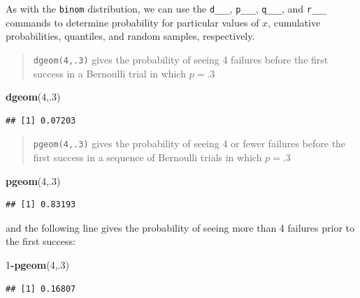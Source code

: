 \documentclass[
]{book}
\newenvironment{Shaded}{\begin{snugshade}}{\end{snugshade}}
\newcommand{\DecValTok}[1]{\textcolor[rgb]{0.00,0.00,0.81}{#1}}
\newcommand{\FunctionTok}[1]{\textcolor[rgb]{0.13,0.29,0.53}{\textbf{#1}}}
\newcommand{\NormalTok}[1]{#1}
\newcommand{\SpecialCharTok}[1]{\textcolor[rgb]{0.81,0.36,0.00}{\textbf{#1}}}
\theoremstyle{definition}
\theoremstyle{definition}
\theoremstyle{definition}
\theoremstyle{definition}
\theoremstyle{remark}
\begin{document}
As with the \texttt{binom} distribution, we can use the \texttt{d\_\_\_}, \texttt{p\_\_\_}, \texttt{q\_\_\_}, and \texttt{r\_\_\_} commands to determine probability for particular values of \(x\), cumulative probabilities, quantiles, and random samples, respectively.

\begin{quote}
\texttt{dgeom(4,.3)} gives the probability of seeing 4 failures before the first success in a Bernoulli trial in which \(p = .3\)
\end{quote}

\begin{Shaded}
\begin{Highlighting}[]
\FunctionTok{dgeom}\NormalTok{(}\DecValTok{4}\NormalTok{,.}\DecValTok{3}\NormalTok{)}
\end{Highlighting}
\end{Shaded}

\begin{verbatim}
## [1] 0.07203
\end{verbatim}

\begin{quote}
\texttt{pgeom(4,.3)} gives the probability of seeing 4 or fewer failures before the first success in a sequence of Bernoulli trials in which \(p = .3\)
\end{quote}

\begin{Shaded}
\begin{Highlighting}[]
\FunctionTok{pgeom}\NormalTok{(}\DecValTok{4}\NormalTok{,.}\DecValTok{3}\NormalTok{)}
\end{Highlighting}
\end{Shaded}

\begin{verbatim}
## [1] 0.83193
\end{verbatim}

and the following line gives the probability of seeing more than 4 failures prior to the first success:

\begin{Shaded}
\begin{Highlighting}[]
\DecValTok{1}\SpecialCharTok{{-}}\FunctionTok{pgeom}\NormalTok{(}\DecValTok{4}\NormalTok{,.}\DecValTok{3}\NormalTok{)}
\end{Highlighting}
\end{Shaded}

\begin{verbatim}
## [1] 0.16807
\end{verbatim}
\end{document}
